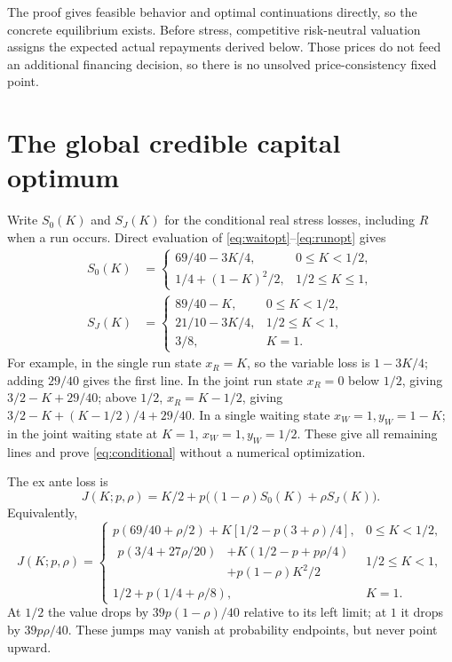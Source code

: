 \documentclass[11pt,a4paper]{article}
\numberwithin{equation}{section}
\theoremstyle{definition}
\begin{document}
The proof gives feasible behavior and optimal continuations directly,
so the concrete equilibrium exists. Before stress, competitive
risk-neutral valuation assigns the expected actual repayments derived
below. Those prices do not feed an additional financing decision, so
there is no unsolved price-consistency fixed point.

\section{The global credible capital optimum}\label{sec:capital}

Write \(S_0(K)\) and \(S_J(K)\) for the conditional real stress losses,
including \(R\) when a run occurs. Direct evaluation of
\eqref{eq:waitopt}--\eqref{eq:runopt} gives
\begin{equation}\label{eq:conditional}
\begin{aligned}
S_0(K)&=
\begin{cases}
69/40-3K/4,&0\le K<1/2,\\
1/4+(1-K)^2/2,&1/2\le K\le1,
\end{cases}\\
S_J(K)&=
\begin{cases}
89/40-K,&0\le K<1/2,\\
21/10-3K/4,&1/2\le K<1,\\
3/8,&K=1.
\end{cases}
\end{aligned}
\end{equation}
For example, in the single run state \(x_R=K\), so the variable loss
is \(1-3K/4\); adding \(29/40\) gives the first line. In the joint
run state \(x_R=0\) below \(1/2\), giving \(3/2-K+29/40\);
above \(1/2\), \(x_R=K-1/2\), giving
\(3/2-K+(K-1/2)/4+29/40\). In a single waiting state
\(x_W=1,y_W=1-K\); in the joint waiting state at \(K=1\),
\(x_W=1,y_W=1/2\). These give all remaining lines and prove
\eqref{eq:conditional} without a numerical optimization.

The ex ante loss is
\begin{equation}\label{eq:Jdef}
 J(K;p,\rho)=K/2+p\bigl((1-\rho)S_0(K)+\rho S_J(K)\bigr).
\end{equation}
Equivalently,
\begin{equation}\label{eq:J}
J(K;p,\rho)=
\begin{cases}
p(69/40+\rho/2)+K[1/2-p(3+\rho)/4],
       &0\le K<1/2,\\
\begin{aligned}
p(3/4+27\rho/20)&+K(1/2-p+p\rho/4)\\
                &+p(1-\rho)K^2/2
\end{aligned}&1/2\le K<1,\\
1/2+p(1/4+\rho/8),&K=1.
\end{cases}
\end{equation}
At \(1/2\) the value drops by \(39p(1-\rho)/40\) relative to its
left limit; at \(1\) it drops by \(39p\rho/40\). These jumps may
vanish at probability endpoints, but never point upward.
\end{document}
